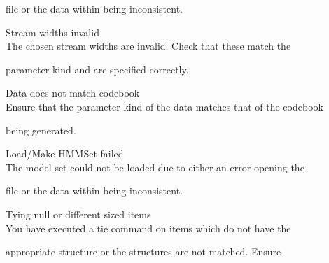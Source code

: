 \begin{itemize}
\begin{itemize}
        file or the data within being inconsistent.





\end{itemize}










\begin{itemize}


    Stream widths invalid\\


        The chosen stream widths are invalid.  Check that these match the 


        parameter kind and are specified correctly.





    Data does not match codebook\\


        Ensure that the parameter kind of the data matches that of the codebook


        being generated.





\end{itemize}










\begin{itemize}





    Load/Make HMMSet failed\\


        The model set could not be loaded due to either an error opening the


        file or the data within being inconsistent.





 Tying null or different sized items\\


        You have executed a tie command on items which do not have the 


        appropriate structure or the structures are not matched.  Ensure 



\end{itemize}
\end{itemize}
